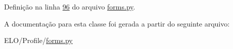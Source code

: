 Definição na linha \hyperlink{Profile_2forms_8py_source_l00096}{96} do arquivo \hyperlink{Profile_2forms_8py_source}{forms.\-py}.



A documentação para esta classe foi gerada a partir do seguinte arquivo\-:\begin{DoxyCompactItemize}
\item 
E\-L\-O/\-Profile/\hyperlink{Profile_2forms_8py}{forms.\-py}\end{DoxyCompactItemize}
